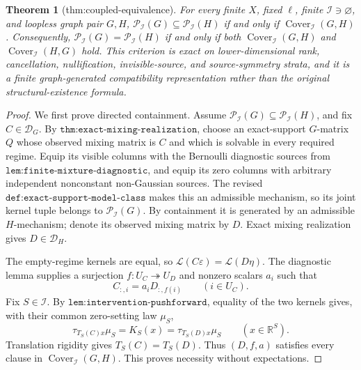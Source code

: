 \documentclass{article}
\newtheorem{theorem}{Theorem}
\begin{document}
\begin{theorem}[thm:coupled-equivalence]\label{thm:coupled-equivalence}
For every finite \(X\), fixed \(\ell\), finite \(\mathcal I\ni\varnothing\), and loopless graph pair \(G,H\), \(\mathcal P_{\mathcal I}(G)\subseteq\mathcal P_{\mathcal I}(H)\) if and only if \(\operatorname{Cover}_{\mathcal I}(G,H)\). Consequently, \(\mathcal P_{\mathcal I}(G)=\mathcal P_{\mathcal I}(H)\) if and only if both \(\operatorname{Cover}_{\mathcal I}(G,H)\) and \(\operatorname{Cover}_{\mathcal I}(H,G)\) hold. This criterion is exact on lower-dimensional rank, cancellation, nullification, invisible-source, and source-symmetry strata, and it is a finite graph-generated compatibility representation rather than the original structural-existence formula.
\end{theorem}
\begin{proof}
We first prove directed containment. Assume \(\mathcal P_{\mathcal I}(G)\subseteq\mathcal P_{\mathcal I}(H)\), and fix \(C\in\mathcal D_G\). By \(\texttt{thm:exact-mixing-realization}\), choose an exact-support \(G\)-matrix \(Q\) whose observed mixing matrix is \(C\) and which is solvable in every required regime. Equip its visible columns with the Bernoulli diagnostic sources from \(\texttt{lem:finite-mixture-diagnostic}\), and equip its zero columns with arbitrary independent nonconstant non-Gaussian sources. The revised \(\texttt{def:exact-support-model-class}\) makes this an admissible mechanism, so its joint kernel tuple belongs to \(\mathcal P_{\mathcal I}(G)\). By containment it is generated by an admissible \(H\)-mechanism; denote its observed mixing matrix by \(D\). Exact mixing realization gives \(D\in\mathcal D_H\).

The empty-regime kernels are equal, so \(\mathcal L(C\varepsilon)=\mathcal L(D\eta)\). The diagnostic lemma supplies a surjection \(f:U_C\twoheadrightarrow U_D\) and nonzero scalars \(a_i\) such that
\[
C_{:,i}=a_iD_{:,f(i)}\qquad(i\in U_C). \tag{7}
\]
Fix \(S\in\mathcal I\). By \(\texttt{lem:intervention-pushforward}\), equality of the two kernels gives, with their common zero-setting law \(\mu_S\),
\[
\tau_{T_S(C)x}\mu_S=K_S(x)=\tau_{T_S(D)x}\mu_S
\qquad(x\in\mathbb R^S).
\]
Translation rigidity gives \(T_S(C)=T_S(D)\). Thus \((D,f,a)\) satisfies every clause in \(\operatorname{Cover}_{\mathcal I}(G,H)\). This proves necessity without expectations.


\end{proof}
\end{document}
